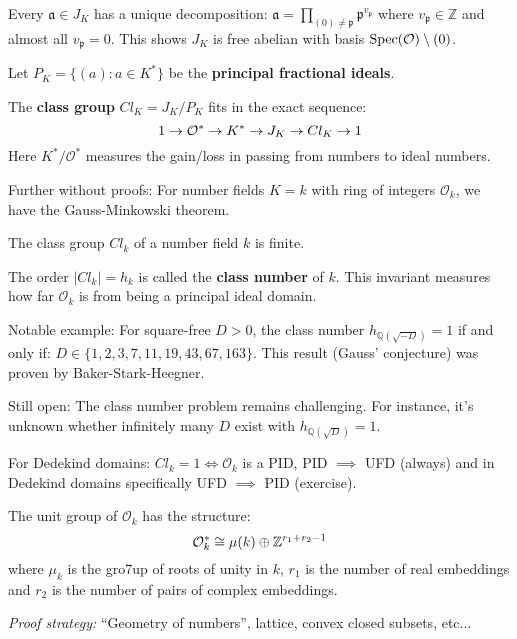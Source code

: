 \begin{outline}
\0 \begin{corollary}
Every $\mathfrak{a} \in J_K$ has a unique decomposition:
$\mathfrak{a} = \prod_{(0)\neq \mathfrak{p}}\mathfrak{p}^{v_\mathfrak{p}}$
where $v_\mathfrak{p} \in \mathbb{Z}$ and almost all $v_\mathfrak{p} = 0$. This shows $J_K$ is free abelian with basis $\operatorname{Spec}(\mathcal{O}) \setminus {(0)}$.
\end{corollary}

\0 Let $P_K = \{(a) : a \in K^*\}$ be the \textbf{principal fractional ideals}.

\0 \begin{definition}
    The \textbf{class group} $Cl_K = J_K/P_K$ fits in the exact sequence: 
    $$1 \rightarrow \mathcal{O}^* \rightarrow K^* \rightarrow J_K \rightarrow Cl_K \rightarrow 1$$
    Here $K^*/\mathcal{O}^*$ measures the gain/loss in passing from numbers to ideal numbers.
\end{definition}

\1 Further without proofs: For number fields $K=k$ with ring of integers $\mathcal{O}_k$, we have the Gauss-Minkowski theorem.

\0 \begin{theorem}
The class group $Cl_k$ of a number field $k$ is finite.
\end{theorem}

\1 The order $|Cl_k| = h_k$ is called the \textbf{class number} of $k$. This invariant measures how far $\mathcal{O}_k$ is from being a principal ideal domain.

    \2 Notable example: For square-free $D > 0$, the class number $h_{\mathbb{Q}(\sqrt{-D})} = 1$ if and only if: $D \in \{1,2,3,7,11,19,43,67,163\}$. This result (Gauss' conjecture) was proven by Baker-Stark-Heegner.

    \2 Still open: The class number problem remains challenging. For instance, it's unknown whether infinitely many $D$ exist with $h_{\mathbb{Q}(\sqrt{D})} = 1$.

\1 For Dedekind domains: $Cl_k = 1 \iff \mathcal{O}_k$ is a PID, PID $\implies$ UFD (always) and in Dedekind domains specifically UFD $\implies$ PID (exercise).

\0 \begin{theorem}
    The unit group of $\mathcal{O}_k$ has the structure:
    $$\mathcal{O}^*_k \cong \mu(k)\oplus \mathbb{Z}^{r_1 + r_2 -1}$$ 
    where $\mu_k$ is the gro7up of roots of unity in $k$, $r_1$ is the number of real embeddings and $r_2$ is the number of pairs of complex embeddings.
\end{theorem}
\textit{Proof strategy:} \enquote{Geometry of numbers}, lattice, convex closed subsets, etc...


\end{outline}
